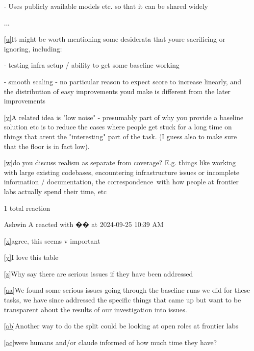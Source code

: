 \documentclass[
]{article}
\begin{document}
{- Uses publicly available models etc. so that it can be shared widely}

{...}

\label{cmnt21}\hyperref[cmnt_ref21]{{[}u{]}}{It might be
worth mentioning some desiderata that you\textquotesingle re sacrificing
or ignoring, including:}

{- testing infra setup / ability to get some baseline working}

{- smooth scaling - no particular reason to expect score to increase
linearly, and the distribution of easy improvements
you\textquotesingle d make is different from the later improvements}

\label{cmnt22}\hyperref[cmnt_ref22]{{[}v{]}}{A related
idea is "low noise" - presumably part of why you provide a baseline
solution etc is to reduce the cases where people get stuck for a long
time on things that aren\textquotesingle t the "interesting" part of the
task. (I guess also to make sure that the floor is in fact low).}

\label{cmnt23}\hyperref[cmnt_ref23]{{[}w{]}}{do you
discuss realism as separate from coverage? E.g. things like working with
large existing codebases, encountering infrastructure issues or
incomplete information / documentation, the correspondence~with how
people at frontier labs actually spend their time, etc}

{1 total reaction}

{Ashwin A reacted with �� at 2024-09-25 10:39 AM}

\label{cmnt24}\hyperref[cmnt_ref24]{{[}x{]}}{agree, this
seems v important}

\label{cmnt25}\hyperref[cmnt_ref25]{{[}y{]}}{I love this
table}

\label{cmnt26}\hyperref[cmnt_ref26]{{[}z{]}}{Why say
there are serious issues if they have been addressed}

\label{cmnt27}\hyperref[cmnt_ref27]{{[}aa{]}}{We found
some serious issues going through the baseline runs we did for these
tasks, we have since addressed the specific things that came up but want
to be transparent about the results of our investigation into issues.}

\label{cmnt28}\hyperref[cmnt_ref28]{{[}ab{]}}{Another way
to do the split could be looking at open roles at frontier labs}

\label{cmnt29}\hyperref[cmnt_ref29]{{[}ac{]}}{were humans
and/or claude informed of how much time they have?}
\end{document}
